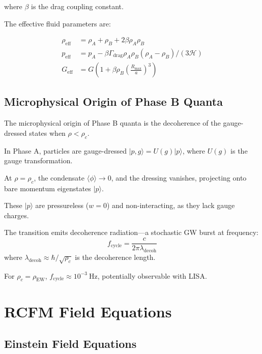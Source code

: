 \documentclass[10pt,twocolumn]{article}
\theoremstyle{definition}
\newcommand{\Rmax}{R_{\max}}
\newcommand{\rhoA}{\rho_{A}}
\newcommand{\rhoB}{\rho_{B}}
\newcommand{\Hcal}{\mathcal{H}}
\newcommand{\Gammadrag}{\Gamma_{\mathrm{drag}}}
\newcommand{\rhoc}{\rho_{c}}
\newcommand{\rhoEW}{\rho_{\mathrm{EW}}}
\begin{document}
where \( \beta \) is the drag coupling constant.

The effective fluid parameters are:

\begin{align}
  \rho_{\mathrm{eff}} &= \rhoA + \rhoB + 2 \beta \rhoA \rhoB \\
  p_{\mathrm{eff}} &= p_{A} - \beta \Gammadrag \rhoA \rhoB (\rhoA - \rhoB) / (3 \Hcal) \\
  G_{\mathrm{eff}} &= G \left(1 + \beta \rhoB \left(\frac{\Rmax}{a}\right)^{3}\right)
\end{align}%


\subsection{Microphysical Origin of Phase B Quanta}
\label{sec:phaseB-micro}

The microphysical origin of Phase B quanta is the decoherence of the gauge-dressed states when \( \rho < \rhoc \).

In Phase A, particles are gauge-dressed \( |p, g\rangle = U(g) |p\rangle \), where \( U(g) \) is the gauge transformation.

At \( \rho = \rhoc \), the condensate \( \langle \phi \rangle \to 0 \), and the dressing vanishes, projecting onto bare momentum eigenstates \( |p\rangle \).

These \( |p\rangle \) are pressureless (\( w = 0 \)) and non-interacting, as they lack gauge charges.

The transition emits decoherence radiation---a stochastic GW burst at frequency:
\begin{equation}
  f_{\mathrm{cycle}} = \frac{c}{2\pi\lambda_{\mathrm{decoh}}}
  \label{eq:f-cycle}
\end{equation}
where \( \lambda_{\mathrm{decoh}} \approx \hbar / \sqrt{\rhoc} \) is the decoherence length.

For \( \rhoc = \rhoEW \), \( f_{\mathrm{cycle}} \approx 10^{-3} \ \mathrm{Hz} \), potentially observable with LISA.

\section{RCFM Field Equations}
\label{sec:fe}



\subsection{Einstein Field Equations}
\end{document}
